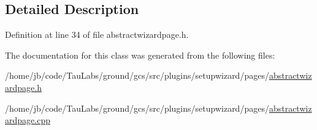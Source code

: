 \subsection{\-Detailed \-Description}


\-Definition at line 34 of file abstractwizardpage.\-h.



\-The documentation for this class was generated from the following files\-:\begin{DoxyCompactItemize}
\item 
/home/jb/code/\-Tau\-Labs/ground/gcs/src/plugins/setupwizard/pages/\hyperlink{abstractwizardpage_8h}{abstractwizardpage.\-h}\item 
/home/jb/code/\-Tau\-Labs/ground/gcs/src/plugins/setupwizard/pages/\hyperlink{abstractwizardpage_8cpp}{abstractwizardpage.\-cpp}\end{DoxyCompactItemize}
